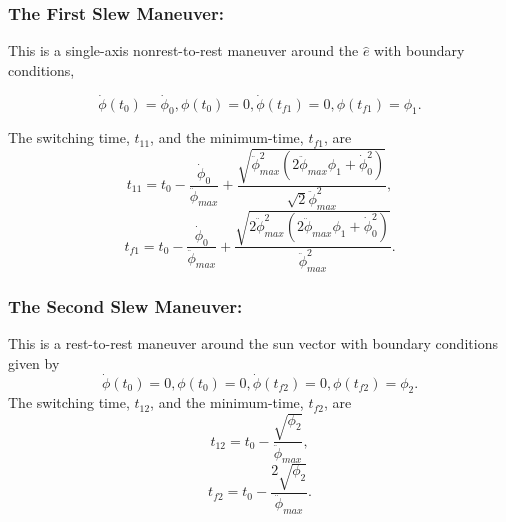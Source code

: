 \documentclass[letterpaper, paper,12pt]{AAS}		%
\begin{document}
	
	\subsubsection{The First Slew Maneuver:} 
	This is a single-axis nonrest-to-rest maneuver around the $\hat{e}$ with boundary conditions,

	\begin{equation}\label{Bc1}
	\dot{\phi}(t_0)=\dot{\phi}_{0},\phi(t_0)=0, \dot{\phi}(t_{f1})=0,\phi(t_{f1})=\phi_1.
	\end{equation}
	
	The switching time, $t_{11}$, and the minimum-time, $t_{f1}$, are 
	\begin{equation}\label{t11}
	t_{11}=t_0-\frac{\dot{\phi}_0}{\ddot{\phi}_{max}}+\frac{\sqrt{\ddot{\phi}_{max}^2(2\ddot{\phi}_{max}\phi_1+\dot{\phi}_{0}^2)}}{\sqrt{2}\ddot{\phi}_{max}^2},
	\end{equation}
	\begin{equation}\label{tf1}
	t_{f1}=t_0-\frac{\dot{\phi}_0}{\ddot{\phi}_{max}}+\frac{\sqrt{2\ddot{\phi}_{max}^2(2\ddot{\phi}_{max}\phi_1+\dot{\phi}_{0}^2)}}{\ddot{\phi}_{max}^2}.
	\end{equation}

	
	
	\subsubsection{The Second Slew Maneuver:}
	This is a rest-to-rest maneuver around the sun vector with boundary conditions given by	
	\begin{equation}\label{Bc2}
	\dot{\phi}(t_0)=0, \phi(t_0)=0, \dot{\phi}(t_{f2})=0, \phi(t_{f2})=\phi_2.
	\end{equation}
	The switching time, $t_{12}$, and the minimum-time, $t_{f2}$, are
	\begin{equation}\label{t21}
	t_{12}=t_0-\frac{\sqrt{\phi_2}}{\ddot{\phi}_{max}},
	\end{equation}
	\begin{equation}\label{tf2}
	t_{f2}=t_0-\frac{2\sqrt{\phi_2}}{\ddot{\phi}_{max}}.
	\end{equation}
\end{document}
